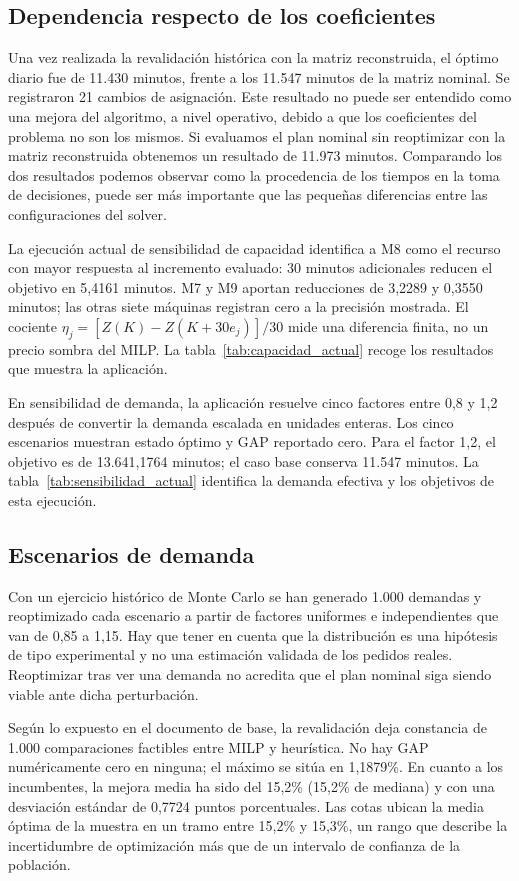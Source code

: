 \documentclass[12pt,a4paper,oneside]{article}
\begin{document}
\subsection{Dependencia respecto de los coeficientes}
Una vez realizada la revalidación histórica con la matriz reconstruida, el óptimo diario fue de 11.430 minutos, frente a los 11.547 minutos de la matriz nominal. Se registraron 21 cambios de asignación. Este resultado no puede ser entendido como una mejora del algoritmo, a nivel operativo, debido a que los coeficientes del problema no son los mismos. Si evaluamos el plan nominal sin reoptimizar con la matriz reconstruida obtenemos un resultado de 11.973 minutos. Comparando los dos resultados podemos observar como la procedencia de los tiempos en la toma de decisiones, puede ser más importante que las pequeñas diferencias entre las configuraciones del solver.

La ejecución actual de sensibilidad de capacidad identifica a M8 como el recurso con mayor respuesta al incremento evaluado: 30 minutos adicionales reducen el objetivo en 5,4161 minutos. M7 y M9 aportan reducciones de 3,2289 y 0,3550 minutos; las otras siete máquinas registran cero a la precisión mostrada. El cociente $\eta_j=[Z(K)-Z(K+30e_j)]/30$ mide una diferencia finita, no un precio sombra del MILP. La tabla~\ref{tab:capacidad_actual} recoge los resultados que muestra la aplicación.

En sensibilidad de demanda, la aplicación resuelve cinco factores entre 0,8 y 1,2 después de convertir la demanda escalada en unidades enteras. Los cinco escenarios muestran estado óptimo y GAP reportado cero. Para el factor 1,2, el objetivo es de 13.641,1764 minutos; el caso base conserva 11.547 minutos. La tabla~\ref{tab:sensibilidad_actual} identifica la demanda efectiva y los objetivos de esta ejecución.

\subsection{Escenarios de demanda}
Con un ejercicio histórico de Monte Carlo se han generado 1.000 demandas y reoptimizado cada escenario a partir de factores uniformes e independientes que van de 0,85 a 1,15. Hay que tener en cuenta que la distribución es una hipótesis de tipo experimental y no una estimación validada de los pedidos reales. Reoptimizar tras ver una demanda no acredita que el plan nominal siga siendo viable ante dicha perturbación.

Según lo expuesto en el documento de base, la revalidación deja constancia de 1.000 comparaciones factibles entre MILP y heurística. No hay GAP numéricamente cero en ninguna; el máximo se sitúa en 1,1879\%. En cuanto a los incumbentes, la mejora media ha sido del 15,2\% (15,2\% de mediana) y con una desviación estándar de 0,7724 puntos porcentuales. Las cotas ubican la media óptima de la muestra en un tramo entre 15,2\% y 15,3\%, un rango que describe la incertidumbre de optimización más que de un intervalo de confianza de la población.
\end{document}
